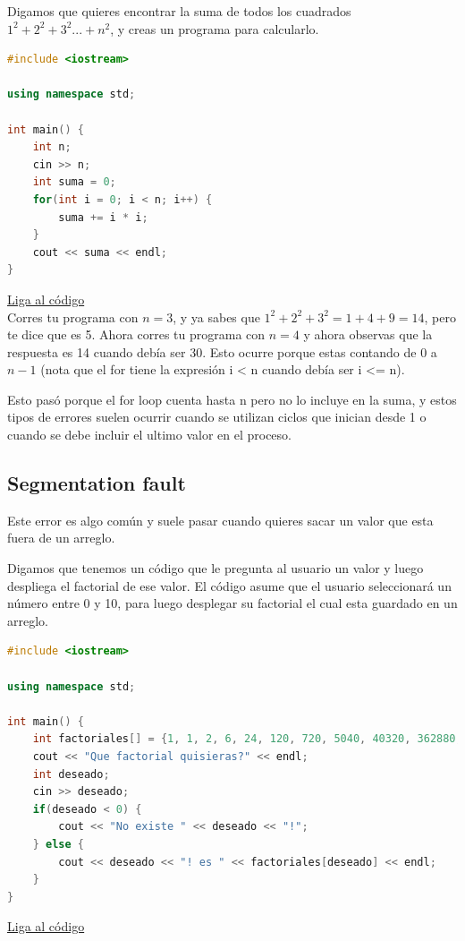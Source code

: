 \documentclass{article}
\begin{document}
Digamos que quieres encontrar la suma de todos los cuadrados $1^2 + 2^2 + 3^2 ... + n^2$, y creas un programa para calcularlo.

\begin{lstlisting}[language=C++, caption=Error por uno]
#include <iostream>

using namespace std;

int main() {
    int n;
    cin >> n;
    int suma = 0;
    for(int i = 0; i < n; i++) {
        suma += i * i;
    }
    cout << suma << endl;
}
\end{lstlisting}
\href{https://repl.it/@Jamesscn/Sumás-Cuadrados}{Liga al código}\\

Corres tu programa con $n = 3$, y ya sabes que $1^2 + 2^2 + 3^2 = 1 + 4 + 9 = 14$, pero te dice que es 5. Ahora corres tu programa con $n = 4$ y ahora observas que la respuesta es 14 cuando debía ser 30. Esto ocurre porque estas contando de $0$ a $n-1$ (nota que el for tiene la expresión i < n cuando debía ser i <= n).

Esto pasó porque el for loop cuenta hasta n pero no lo incluye en la suma, y estos tipos de errores suelen ocurrir cuando se utilizan ciclos que inician desde 1 o cuando se debe incluir el ultimo valor en el proceso.

\subsection{Segmentation fault}
Este error es algo común y suele pasar cuando quieres sacar un valor que esta fuera de un arreglo.

Digamos que tenemos un código que le pregunta al usuario un valor y luego despliega el factorial de ese valor. El código asume que el usuario seleccionará un número entre 0 y 10, para luego desplegar su factorial el cual esta guardado en un arreglo.

\begin{lstlisting}[language=C++, caption=Error de inicialización]
#include <iostream>

using namespace std;

int main() {
    int factoriales[] = {1, 1, 2, 6, 24, 120, 720, 5040, 40320, 362880, 3628800};
    cout << "Que factorial quisieras?" << endl;
    int deseado;
    cin >> deseado;
    if(deseado < 0) {
        cout << "No existe " << deseado << "!";
    } else {
        cout << deseado << "! es " << factoriales[deseado] << endl;
    }
}
\end{lstlisting}
\href{https://repl.it/@Jamesscn/Indices-Inexistentes}{Liga al código}\\
\end{document}
